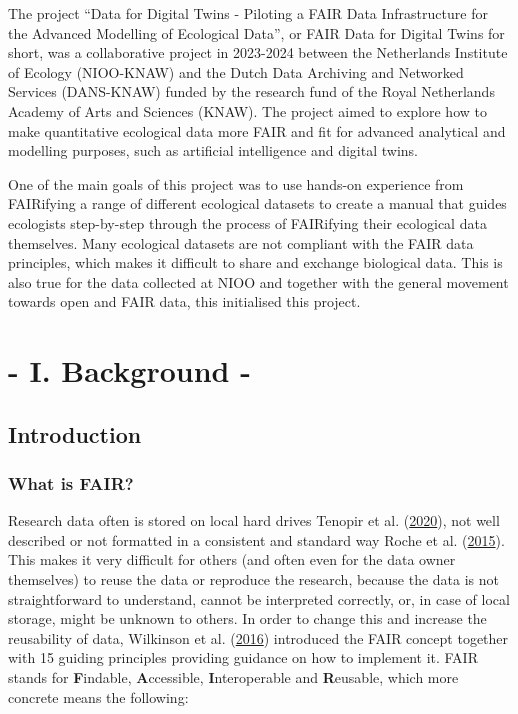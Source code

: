 \documentclass[
]{book}
\begin{document}
The project ``Data for Digital Twins - Piloting a FAIR Data Infrastructure for the Advanced Modelling of Ecological Data'', or FAIR Data for Digital Twins for short, was a collaborative project in 2023-2024 between the Netherlands Institute of Ecology (NIOO-KNAW) and the Dutch Data Archiving and Networked Services (DANS-KNAW) funded by the research fund of the Royal Netherlands Academy of Arts and Sciences (KNAW). The project aimed to explore how to make quantitative ecological data more FAIR and fit for advanced analytical and modelling purposes, such as artificial intelligence and digital twins.

One of the main goals of this project was to use hands-on experience from FAIRifying a range of different ecological datasets to create a manual that guides ecologists step-by-step through the process of FAIRifying their ecological data themselves. Many ecological datasets are not compliant with the FAIR data principles, which makes it difficult to share and exchange biological data. This is also true for the data collected at NIOO and together with the general movement towards open and FAIR data, this initialised this project.

\hypertarget{part---i.-background--}{%
\part*{- I. Background -}\label{part---i.-background--}}

\hypertarget{introduction}{%
\chapter{Introduction}\label{introduction}}

\hypertarget{what-is-fair}{%
\section{What is FAIR?}\label{what-is-fair}}

Research data often is stored on local hard drives Tenopir et al. (\protect\hyperlink{ref-Tenopir_2020}{2020}), not well described or not formatted in a consistent and standard way Roche et al. (\protect\hyperlink{ref-Roche_2015}{2015}). This makes it very difficult for others (and often even for the data owner themselves) to reuse the data or reproduce the research, because the data is not straightforward to understand, cannot be interpreted correctly, or, in case of local storage, might be unknown to others. In order to change this and increase the reusability of data, Wilkinson et al. (\protect\hyperlink{ref-Wilkinson_2016}{2016}) introduced the FAIR concept together with 15 guiding principles providing guidance on how to implement it. FAIR stands for \textbf{F}indable, \textbf{A}ccessible, \textbf{I}nteroperable and \textbf{R}eusable, which more concrete means the following:
\end{document}
